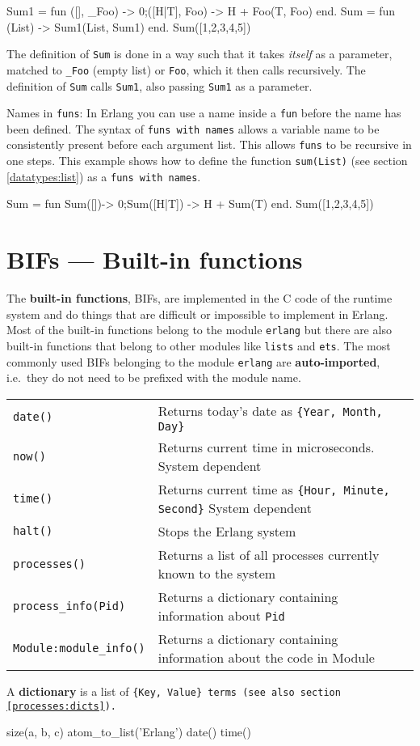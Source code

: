 \begin{erlang}
Sum1 = fun ([], _Foo) -> 0;([H|T], Foo) -> H + Foo(T, Foo) end.
Sum = fun (List) -> Sum1(List, Sum1) end.
Sum([1,2,3,4,5])    %
\end{erlang}

The definition of \texttt{Sum} is done in a way such that it takes \textit{itself} as a parameter, matched to \texttt{\_Foo} (empty list) or \texttt{Foo},
which it then calls recursively.  The definition of \texttt{Sum} calls \texttt{Sum1}, also passing \texttt{Sum1} as a parameter.


Names in \texttt{funs}: In Erlang you can use a name inside a \texttt{fun} before the name has been
defined. The syntax of \texttt{funs with names} allows a variable name to be
consistently present before each argument list. This allows \texttt{funs} to be
recursive in one steps. This example shows how to define the function
\texttt{sum(List)} (see section \ref{datatypes:list}) as a \texttt{funs with names}.

\begin{erlang}
Sum = fun Sum([])-> 0;Sum([H|T]) -> H + Sum(T) end.
Sum([1,2,3,4,5])    %
\end{erlang}


\section{BIFs --- Built-in functions}
\label{functions:bifs}
The \textbf{built-in functions}, BIFs, are implemented in the C code of
the runtime system and do things that are difficult or impossible to
implement in Erlang. Most of the built-in functions belong to the
module \texttt{erlang} but there are also built-in functions that belong
to other modules like \texttt{lists} and \texttt{ets}. The most
commonly used BIFs belonging to the module \texttt{erlang} are
\textbf{auto-imported}, i.e.~they do not need to be prefixed with the
module name.

\begin{center}
\begin{tabular}{|>{\raggedright}p{103pt}|>{\raggedright}p{217pt}|}
\hline
\multicolumn{2}{|p{321pt}|}{Some useful BIFs}\tabularnewline
\hline
\texttt{date()} & Returns today's date as \texttt{\{Year, Month, Day\}}\tabularnewline
\hline
\texttt{now()} & Returns current time in microseconds. System dependent\tabularnewline
\hline
\texttt{time()} & Returns current time as \texttt{\{Hour, Minute, Second\}} System dependent\tabularnewline
\hline
\texttt{halt()} & Stops the Erlang system\tabularnewline
\hline
\texttt{processes()} & Returns a list of all processes currently known to the system\tabularnewline
\hline
\texttt{process\_info(Pid)} & Returns a dictionary containing information about \texttt{Pid}\tabularnewline
\hline
\texttt{Module:module\_info()} & Returns a dictionary containing information about the code
in Module\tabularnewline
\hline
\end{tabular}
\end{center}

A \textbf{dictionary} is a list of \texttt{\{Key, Value\} terms (see
also section \ref{processes:dicts}).}

\begin{erlang}
size({a, b, c})             %
atom_to_list('Erlang')      %
date()                      %
time()                      %
\end{erlang}

